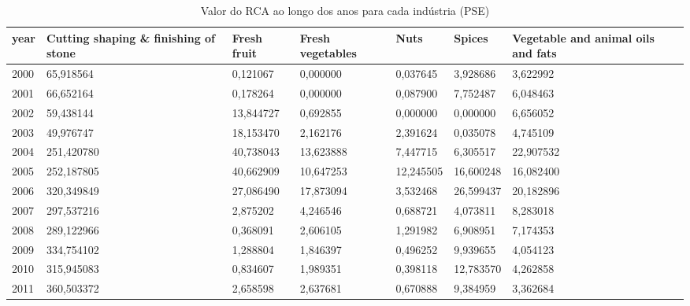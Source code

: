\begin{table}
\centering
\caption{Valor do RCA ao longo dos anos para cada indústria (PSE)}
\begin{tabular}{p{1cm}p{2cm}p{2cm}p{2cm}p{2cm}p{2cm}p{2cm}}
\toprule
 year &  Cutting shaping \& finishing of stone &  Fresh fruit &  Fresh vegetables &      Nuts &    Spices &  Vegetable and animal oils and fats \\
\midrule
 2000 &                             65,918564 &     0,121067 &          0,000000 &  0,037645 &  3,928686 &                            3,622992 \\
 2001 &                             66,652164 &     0,178264 &          0,000000 &  0,087900 &  7,752487 &                            6,048463 \\
 2002 &                             59,438144 &    13,844727 &          0,692855 &  0,000000 &  0,000000 &                            6,656052 \\
 2003 &                             49,976747 &    18,153470 &          2,162176 &  2,391624 &  0,035078 &                            4,745109 \\
 2004 &                            251,420780 &    40,738043 &         13,623888 &  7,447715 &  6,305517 &                           22,907532 \\
 2005 &                            252,187805 &    40,662909 &         10,647253 & 12,245505 & 16,600248 &                           16,082400 \\
 2006 &                            320,349849 &    27,086490 &         17,873094 &  3,532468 & 26,599437 &                           20,182896 \\
 2007 &                            297,537216 &     2,875202 &          4,246546 &  0,688721 &  4,073811 &                            8,283018 \\
 2008 &                            289,122966 &     0,368091 &          2,606105 &  1,291982 &  6,908951 &                            7,174353 \\
 2009 &                            334,754102 &     1,288804 &          1,846397 &  0,496252 &  9,939655 &                            4,054123 \\
 2010 &                            315,945083 &     0,834607 &          1,989351 &  0,398118 & 12,783570 &                            4,262858 \\
 2011 &                            360,503372 &     2,658598 &          2,637681 &  0,670888 &  9,384959 &                            3,362684 \\

\end{tabular}
\end{table}
